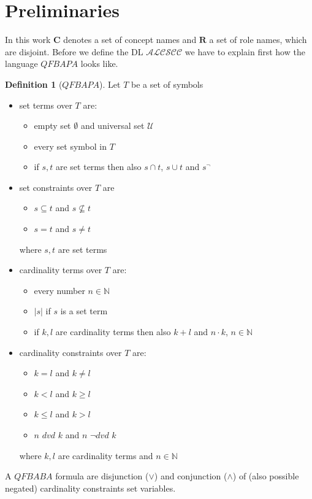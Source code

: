 \documentclass[a4paper,11pt]{scrartcl}
\theoremstyle{break}
\theoremstyle{definition}
\newtheorem{mydef}{Definition}
\begin{document}
\section{Preliminaries}
In this work $\mathbf{C}$ denotes a set of concept names and $\mathbf{R}$ a set of role names, which are disjoint. Before we define the DL $\mathcal{ALCSCC}$ we have to explain first how the language $QFBAPA$ looks like.
\begin{mydef}[$QFBAPA$]
Let $T$ be a set of symbols
\begin{itemize}
\item set terms over $T$ are:
\begin{itemize}
\item empty set $\emptyset$ and universal set $
\mathcal{U}$
\item every set symbol in $T$
\item if $s,t$ are set terms then also $s\cap t$, $s\cup t$ and $s^{\neg}$
\end{itemize}
\item set constraints over $T$ are
\begin{itemize}
\item $s\subseteq t$ and $s\not\subseteq t$
\item $s=t$ and $s\neq t$
\end{itemize}
where $s,t$ are set terms
\item cardinality terms over $T$ are:
\begin{itemize}
\item every number $n\in \mathbb{N}$
\item $|s|$ if $s$ is a set term
\item if $k,l$ are cardinality terms then also $k+l$ and $n\cdot k$, $n\in \mathbb{N}$
\end{itemize}
\item cardinality constraints over $T$ are:
\begin{itemize}
\item $k=l$ and $k\neq l$
\item $k<l$ and $k\geq l$
\item $k\leq l$ and $k>l$
\item $n$ $dvd$ $k$ and $n$ $\neg dvd$ $k$
\end{itemize}
where $k,l$ are cardinality terms and $n\in\mathbb{N}$
\end{itemize}
A $QFBABA$ formula are disjunction ($\vee$) and conjunction ($\wedge$) of (also possible negated) cardinality constraints set variables.
\end{mydef}
\end{document}

